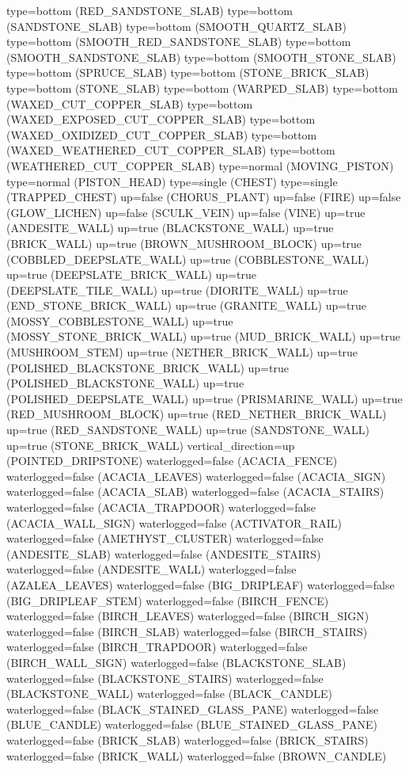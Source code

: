\documentclass[11pt]{article}
\begin{document}
type=bottom (RED_SANDSTONE_SLAB)
type=bottom (SANDSTONE_SLAB)
type=bottom (SMOOTH_QUARTZ_SLAB)
type=bottom (SMOOTH_RED_SANDSTONE_SLAB)
type=bottom (SMOOTH_SANDSTONE_SLAB)
type=bottom (SMOOTH_STONE_SLAB)
type=bottom (SPRUCE_SLAB)
type=bottom (STONE_BRICK_SLAB)
type=bottom (STONE_SLAB)
type=bottom (WARPED_SLAB)
type=bottom (WAXED_CUT_COPPER_SLAB)
type=bottom (WAXED_EXPOSED_CUT_COPPER_SLAB)
type=bottom (WAXED_OXIDIZED_CUT_COPPER_SLAB)
type=bottom (WAXED_WEATHERED_CUT_COPPER_SLAB)
type=bottom (WEATHERED_CUT_COPPER_SLAB)
type=normal (MOVING_PISTON)
type=normal (PISTON_HEAD)
type=single (CHEST)
type=single (TRAPPED_CHEST)
up=false (CHORUS_PLANT)
up=false (FIRE)
up=false (GLOW_LICHEN)
up=false (SCULK_VEIN)
up=false (VINE)
up=true (ANDESITE_WALL)
up=true (BLACKSTONE_WALL)
up=true (BRICK_WALL)
up=true (BROWN_MUSHROOM_BLOCK)
up=true (COBBLED_DEEPSLATE_WALL)
up=true (COBBLESTONE_WALL)
up=true (DEEPSLATE_BRICK_WALL)
up=true (DEEPSLATE_TILE_WALL)
up=true (DIORITE_WALL)
up=true (END_STONE_BRICK_WALL)
up=true (GRANITE_WALL)
up=true (MOSSY_COBBLESTONE_WALL)
up=true (MOSSY_STONE_BRICK_WALL)
up=true (MUD_BRICK_WALL)
up=true (MUSHROOM_STEM)
up=true (NETHER_BRICK_WALL)
up=true (POLISHED_BLACKSTONE_BRICK_WALL)
up=true (POLISHED_BLACKSTONE_WALL)
up=true (POLISHED_DEEPSLATE_WALL)
up=true (PRISMARINE_WALL)
up=true (RED_MUSHROOM_BLOCK)
up=true (RED_NETHER_BRICK_WALL)
up=true (RED_SANDSTONE_WALL)
up=true (SANDSTONE_WALL)
up=true (STONE_BRICK_WALL)
vertical_direction=up (POINTED_DRIPSTONE)
waterlogged=false (ACACIA_FENCE)
waterlogged=false (ACACIA_LEAVES)
waterlogged=false (ACACIA_SIGN)
waterlogged=false (ACACIA_SLAB)
waterlogged=false (ACACIA_STAIRS)
waterlogged=false (ACACIA_TRAPDOOR)
waterlogged=false (ACACIA_WALL_SIGN)
waterlogged=false (ACTIVATOR_RAIL)
waterlogged=false (AMETHYST_CLUSTER)
waterlogged=false (ANDESITE_SLAB)
waterlogged=false (ANDESITE_STAIRS)
waterlogged=false (ANDESITE_WALL)
waterlogged=false (AZALEA_LEAVES)
waterlogged=false (BIG_DRIPLEAF)
waterlogged=false (BIG_DRIPLEAF_STEM)
waterlogged=false (BIRCH_FENCE)
waterlogged=false (BIRCH_LEAVES)
waterlogged=false (BIRCH_SIGN)
waterlogged=false (BIRCH_SLAB)
waterlogged=false (BIRCH_STAIRS)
waterlogged=false (BIRCH_TRAPDOOR)
waterlogged=false (BIRCH_WALL_SIGN)
waterlogged=false (BLACKSTONE_SLAB)
waterlogged=false (BLACKSTONE_STAIRS)
waterlogged=false (BLACKSTONE_WALL)
waterlogged=false (BLACK_CANDLE)
waterlogged=false (BLACK_STAINED_GLASS_PANE)
waterlogged=false (BLUE_CANDLE)
waterlogged=false (BLUE_STAINED_GLASS_PANE)
waterlogged=false (BRICK_SLAB)
waterlogged=false (BRICK_STAIRS)
waterlogged=false (BRICK_WALL)
waterlogged=false (BROWN_CANDLE)
\end{document}
